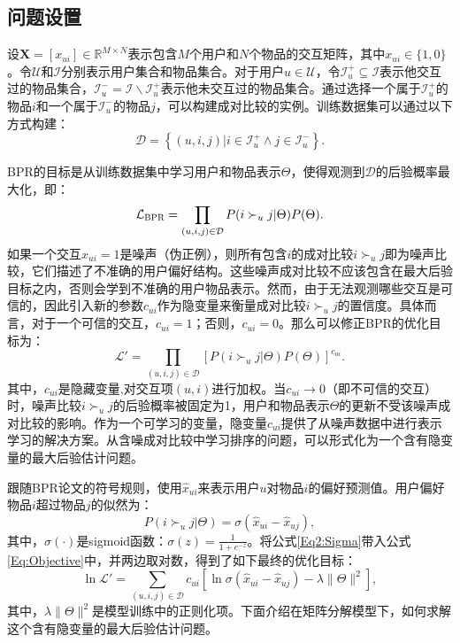 \subsection{问题设置}
设$\mathbf{X}=[x_{ui}] \in \mathbb{R}^{M\times N}$表示包含$M$个用户和$N$个物品的交互矩阵，其中$x_{ui}\in \{1,0\}$。令$\mathcal{U}$和$\mathcal{I}$分别表示用户集合和物品集合。对于用户$u \in \mathcal{U}$，令$\mathcal{I}_u^+ \subseteq \mathcal{I}$表示他交互过的物品集合，$\mathcal{I}_u^- = \mathcal{I}\backslash \mathcal{I}_u^+$表示他未交互过的物品集合。通过选择一个属于$\mathcal{I}_u^+$的物品$i$和一个属于$\mathcal{I}_u^-$的物品$j$，可以构建成对比较的实例。训练数据集可以通过以下方式构建：
\begin{equation}\label{Eq2:obj}
	\mathcal{D} =  \left\{ {(u,i,j)|i \in \mathcal{I}_u^ +  \wedge j \in \mathcal{I}_u^ - } \right\}.
\end{equation}

BPR的目标是从训练数据集中学习用户和物品表示$\Theta$，使得观测到$\mathcal{D}$的后验概率最大化，即：
\begin{equation}\label{Eq:BPRObjective}
\mathcal{L}_\textsc{BPR} = \prod_{(u,i,j) \in \mathcal{D}} P(i \succ_u j|\Theta)P(\Theta).
\end{equation}
如果一个交互$x_{ui}=1$是噪声（伪正例），则所有包含$i$的成对比较$i \succ_u j$即为噪声比较，它们描述了不准确的用户偏好结构。这些噪声成对比较不应该包含在最大后验目标之内，否则会学到不准确的用户物品表示。然而，由于无法观测哪些交互是可信的，因此引入新的参数$c_{ui}$作为隐变量来衡量成对比较$i \succ_u j$的置信度。具体而言，对于一个可信的交互，$c_{ui}=1$；否则，$c_{ui}=0$。那么可以修正BPR的优化目标为：
\begin{equation}\label{Eq:Objective}
\mathcal{L}\prime = \prod_{(u,i,j) \in \mathcal{D}} [P(i \succ_u j|\Theta)P(\Theta)]^{c_{ui}}.
\end{equation}
其中，$c_{ui}$是隐藏变量,对交互项$(u,i)$进行加权。当$c_{ui} \rightarrow 0$（即不可信的交互）时，噪声比较$i \succ_u j$的后验概率被固定为1，用户和物品表示$\Theta$的更新不受该噪声成对比较的影响。作为一个可学习的变量，隐变量$c_{ui}$提供了从噪声数据中进行表示学习的解决方案。从含噪成对比较中学习排序的问题，可以形式化为一个含有隐变量的最大后验估计问题。

跟随BPR论文的符号规则，使用$\hat{x}_{ui}$来表示用户$u$对物品$i$的偏好预测值。用户偏好物品$i$超过物品$j$的似然为：
\begin{equation}\label{Eq2:Sigma}
	P(i \succ_u j | \Theta) = \sigma(\hat{x}_{ui} - \hat{x}_{uj}),
\end{equation}
其中，$\sigma(\cdot)$是sigmoid函数：$\sigma(z) = \frac{1}{1+e^{-z}}$。将公式\eqref{Eq2:Sigma}带入公式\eqref{Eq:Objective}中，并两边取对数，得到了如下最终的优化目标：
\begin{equation}\label{Eq:LogObjective}
\ln	\mathcal{L}\prime = \sum_{(u,i,j) \in \mathcal{D}} c_{ui}\left[\ln \sigma(\hat{x}_{ui} - \hat{x}_{uj}) - \lambda \|\Theta\|^2 \right],
\end{equation}
其中，$\lambda \|\Theta\|^2$是模型训练中的正则化项。下面介绍在矩阵分解模型下，如何求解这个含有隐变量的最大后验估计问题。
